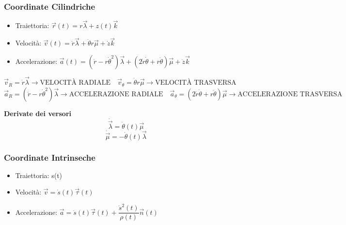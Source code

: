 \documentclass[10pt,a4paper]{article}
\begin{document}
	\subsubsection{Coordinate Cilindriche}
	\begin{itemize}
	\item Traiettoria: \( \vec{r}(t) = r\vec{\lambda} + z(t)\vec{k} \)
	\item Velocità: \( \vec{v}(t) = \dot{r}\vec{\lambda} + \dot{\theta}r\vec{\mu} + \dot{z}\vec{k}\)
	\item Accelerazione: \( \vec{a}(t) = (\ddot{r}-r\dot{\theta}^2)\vec{\lambda} + (2\dot{r}\dot{\theta}+r\ddot{\theta})
		\vec{\mu} + \ddot{z}\vec{k} \)
	\end{itemize}
	\( \vec{v}_R = \dot{r}\vec{\lambda} \rightarrow \text{VELOCITÀ RADIALE} \quad 
		\vec{v}_{\theta} = \dot{\theta}r\vec{\mu}  \rightarrow  \text{VELOCITÀ TRASVERSA} \) \\
	\( \vec{a}_R = (\ddot{r}-r\dot{\theta}^2)\vec{\lambda} \rightarrow \text{ACCELERAZIONE RADIALE} \quad  
		\vec{a}_{\theta} = (2\dot{r}\dot{\theta}+r\ddot{\theta})\vec{\mu} \rightarrow \text{ACCELERAZIONE TRASVERSA}\)
	\vspace{5mm}
	\begin{tcolorbox}
	\large \textbf{Derivate dei versori}
	\vspace{3mm}
	\[ \dot{\vec{\lambda}} = \dot{\theta}(t)\vec{\mu} \]
	\[ \dot{\vec{\mu}} = -\dot{\theta}(t)\vec{\lambda} \]
	\end{tcolorbox}
	\subsubsection{Coordinate Intrinseche}
	\begin{itemize}
	\item Traiettoria: s(t)
	\item Velocità: \( \vec{v} = \dot{s}(t)\vec{\tau}(t) \)
	\item Accelerazione: \( \vec{a} = \ddot{s}(t)\vec{\tau}(t) + \dfrac{\dot{s}^2(t)}{\rho(t)}\vec{n}(t) \)
	\end{itemize}

\end{document}
